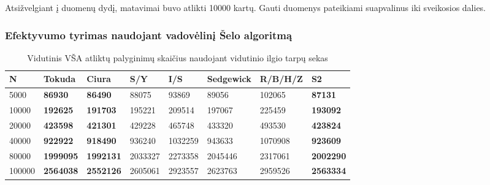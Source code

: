 \documentclass{VUMIFInfKursinis}
\begin{document}
Atsižvelgiant į duomenų dydį, matavimai buvo atlikti 10000 kartų.
Gauti duomenys pateikiami suapvalinus iki sveikosios dalies.

\subsubsection{Efektyvumo tyrimas naudojant vadovėlinį Šelo algoritmą}

\begin{table}[H]
  \caption{Vidutinis VŠA atliktų palyginimų skaičius naudojant vidutinio ilgio tarpų sekas}
  \label{tss_medium_comparisons}
  \begin{tabular}{|l|l|l|l|l|l|l|l|}
  \hline
  N      & Tokuda           & Ciura            & S/Y     & I/S     & Sedgewick & R/B/H/Z & S2               \\ \hline
  5000   & \textbf{86930}   & \textbf{86490}   & 88075   & 93869   & 89056     & 102065  & \textbf{87131}   \\ \hline
  10000  & \textbf{192625}  & \textbf{191703}  & 195221  & 209514  & 197067    & 225459  & \textbf{193092}  \\ \hline
  20000  & \textbf{423598}  & \textbf{421301}  & 429228  & 465748  & 433320    & 493530  & \textbf{423824}  \\ \hline
  40000  & \textbf{922922}  & \textbf{918490}  & 936240  & 1032259 & 943633    & 1070908 & \textbf{923609}  \\ \hline
  80000  & \textbf{1999095} & \textbf{1992131} & 2033327 & 2273358 & 2045446   & 2317061 & \textbf{2002290} \\ \hline
  100000 & \textbf{2564038} & \textbf{2552126} & 2605061 & 2923557 & 2623763   & 2959526 & \textbf{2563334} \\ \hline
  \end{tabular}
\end{table}
\end{document}
